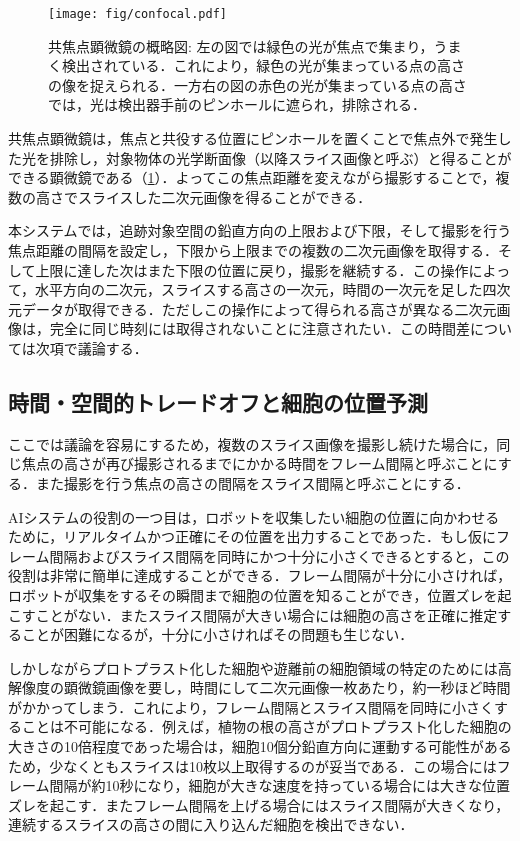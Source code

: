     \begin{figure}[t]
        \centering
        \texttt{[image: fig/confocal.pdf]}
        \caption[共焦点顕微鏡の概略図]{共焦点顕微鏡の概略図: 左の図では緑色の光が焦点で集まり，うまく検出されている．これにより，緑色の光が集まっている点の高さの像を捉えられる．一方右の図の赤色の光が集まっている点の高さでは，光は検出器手前のピンホールに遮られ，排除される．}
        \label{fig:confocal_microscope}
    \end{figure}

    共焦点顕微鏡は，焦点と共役する位置にピンホールを置くことで焦点外で発生した光を排除し，対象物体の光学断面像（以降スライス画像と呼ぶ）と得ることができる顕微鏡である（\ref{fig:confocal_microscope}）．よってこの焦点距離を変えながら撮影することで，複数の高さでスライスした二次元画像を得ることができる．

    本システムでは，追跡対象空間の鉛直方向の上限および下限，そして撮影を行う焦点距離の間隔を設定し，下限から上限までの複数の二次元画像を取得する．そして上限に達した次はまた下限の位置に戻り，撮影を継続する．この操作によって，水平方向の二次元，スライスする高さの一次元，時間の一次元を足した四次元データが取得できる．ただしこの操作によって得られる高さが異なる二次元画像は，完全に同じ時刻には取得されないことに注意されたい．この時間差については次項で議論する．

    \subsection{時間・空間的トレードオフと細胞の位置予測}

    ここでは議論を容易にするため，複数のスライス画像を撮影し続けた場合に，同じ焦点の高さが再び撮影されるまでにかかる時間をフレーム間隔と呼ぶことにする．また撮影を行う焦点の高さの間隔をスライス間隔と呼ぶことにする．

    AIシステムの役割の一つ目は，ロボットを収集したい細胞の位置に向かわせるために，リアルタイムかつ正確にその位置を出力することであった．もし仮にフレーム間隔およびスライス間隔を同時にかつ十分に小さくできるとすると，この役割は非常に簡単に達成することができる．フレーム間隔が十分に小さければ，ロボットが収集をするその瞬間まで細胞の位置を知ることができ，位置ズレを起こすことがない．またスライス間隔が大きい場合には細胞の高さを正確に推定することが困難になるが，十分に小さければその問題も生じない．

    しかしながらプロトプラスト化した細胞や遊離前の細胞領域の特定のためには高解像度の顕微鏡画像を要し，時間にして二次元画像一枚あたり，約一秒ほど時間がかかってしまう．これにより，フレーム間隔とスライス間隔を同時に小さくすることは不可能になる．例えば，植物の根の高さがプロトプラスト化した細胞の大きさの10倍程度であった場合は，細胞10個分鉛直方向に運動する可能性があるため，少なくともスライスは10枚以上取得するのが妥当である．この場合にはフレーム間隔が約10秒になり，細胞が大きな速度を持っている場合には大きな位置ズレを起こす．またフレーム間隔を上げる場合にはスライス間隔が大きくなり，連続するスライスの高さの間に入り込んだ細胞を検出できない．

